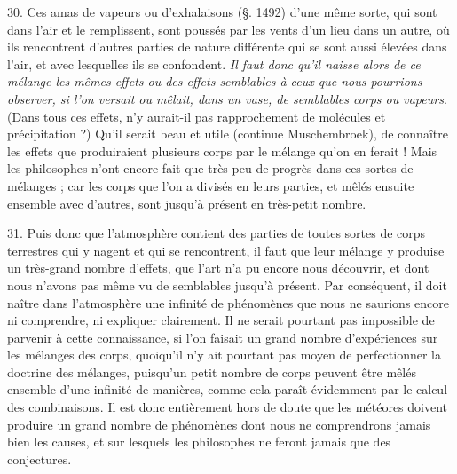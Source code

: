 \documentclass[a4paper, 11pt, oneside, polutonikogreek, french]{article}
\begin{document}
30. \og Ces amas de vapeurs ou d'exhalaisons (§. 1492) d'une même sorte, qui sont dans l'air et le remplissent, sont poussés par les vents d'un lieu dans un autre, où ils rencontrent d'autres parties de nature différente qui se sont aussi élevées dans l'air, et avec lesquelles ils se confondent. \emph{Il faut donc qu'il naisse alors de ce mélange les mêmes effets ou des effets semblables à ceux que nous pourrions observer, si l'on versait ou mêlait, dans un vase, de semblables corps ou vapeurs}. (Dans tous ces effets, n'y aurait-il pas rapprochement de molécules et précipitation ?) Qu'il serait beau et utile (continue Muschembroek), de connaître les effets que produiraient plusieurs corps par le mélange qu'on en ferait ! Mais les philosophes n'ont encore fait que très-peu de progrès dans ces sortes de mélanges ; car les corps que l'on a divisés en leurs parties, et mêlés ensuite ensemble avec d'autres, sont jusqu'à présent en très-petit nombre. \fg

31. \og Puis donc que l'atmosphère contient des parties de toutes sortes de corps terrestres qui y nagent et qui se rencontrent, il faut que leur mélange y produise un très-grand nombre d'effets, que l'art n'a pu encore nous découvrir, et dont nous n'avons pas même vu de semblables jusqu'à présent. Par conséquent, il doit naître dans l'atmosphère une infinité de phénomènes que nous ne saurions encore ni comprendre, ni expliquer clairement. Il ne serait pourtant pas impossible de parvenir à cette connaissance, si l'on faisait un grand nombre d'expériences sur les mélanges des corps, quoiqu'il n'y ait pourtant pas moyen de perfectionner la doctrine des mélanges, puisqu'un petit nombre de corps peuvent être mêlés ensemble d'une infinité de manières, comme cela paraît évidemment par le calcul des combinaisons. Il est donc entièrement hors de doute que les météores doivent produire un grand nombre de phénomènes dont nous ne comprendrons jamais bien les causes, et sur lesquels les philosophes ne feront jamais que des conjectures. \fg
\end{document}

